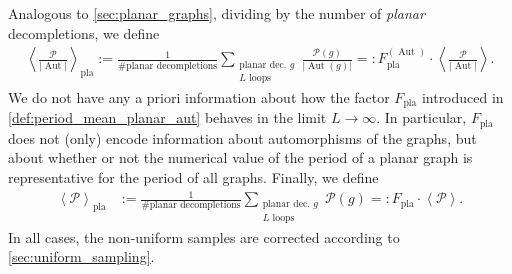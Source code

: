 \documentclass[12pt,a4paper]{article}
\newcommand{\abs}[1]{\lvert #1 \rvert}
\newcommand{\period}{\mathcal P}
\newcommand{\Aut}{\operatorname{Aut}}
\renewcommand{\|}{\rule[-0.4ex]{0.2ex}{1.2em}}
\begin{document}
Analogous to \cref{sec:planar_graphs}, dividing by the number of \emph{planar} decompletions, we define
\begin{align}\label{def:period_mean_planar_aut}
	\left \langle \frac{\period  }{\abs{\Aut }} \right \rangle _\text{pla} := \frac{1}{  \# \text{planar decompletions} } \sum_{\substack{ \text{planar dec. }g \\ L \text{ loops} }} \frac{\period (g)}{\abs{\Aut (g)}} =: F^{(\Aut)}_\text{pla} \cdot \left \langle \frac{\period}{\abs{\Aut}}  \right \rangle .
\end{align}
We do not have any a priori information about how the factor $F_\text{pla}$ introduced in  \cref{def:period_mean_planar_aut}  behaves in the limit $L\rightarrow \infty$. In particular, $F_\text{pla}$ does not (only) encode information about automorphisms of the graphs, but about whether or not the numerical value of the period of a planar graph is representative for the period of all graphs. Finally, we define
\begin{align}\label{def:period_mean_planar}
		\left \langle \period  \right \rangle _\text{pla} &:= \frac{1}{  \# \text{planar decompletions} } \sum_{\substack{ \text{planar dec. }g \\ L \text{ loops} }} \period (g) =: F_\text{pla} \cdot \left \langle \period  \right \rangle.  
\end{align}
In all cases, the non-uniform samples are corrected according to \cref{sec:uniform_sampling}.
\end{document}
